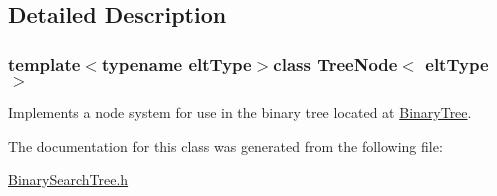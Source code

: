 \subsection{Detailed Description}
\subsubsection*{template$<$typename elt\-Type$>$class Tree\-Node$<$ elt\-Type $>$}

Implements a node system for use in the binary tree located at \hyperlink{classBinaryTree}{Binary\-Tree}. 

The documentation for this class was generated from the following file\-:\begin{DoxyCompactItemize}
\item 
\hyperlink{BinarySearchTree_8h}{Binary\-Search\-Tree.\-h}\end{DoxyCompactItemize}
